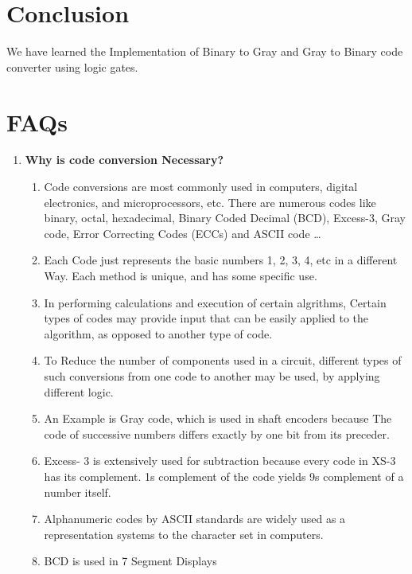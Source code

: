 \documentclass[11pt]{article}
\begin{document}
\section{Conclusion}
We have learned the Implementation of Binary to Gray and Gray to Binary code converter using logic gates.


\section{FAQs}

\begin{enumerate}
	\item \textbf{Why is code conversion Necessary?}
	\begin{enumerate}
		\item Code conversions are most commonly used in computers, digital electronics, and microprocessors, etc. There are numerous codes like binary, octal, hexadecimal, Binary Coded Decimal (BCD), Excess-3, Gray code, Error Correcting Codes (ECCs) and ASCII code \dots
		\item Each Code just represents the basic numbers 1, 2, 3, 4, etc in a different Way. Each method is unique, and has some specific use. 
		\item In performing calculations and execution of certain algrithms, Certain types of codes may provide input that can be easily applied to the algorithm, as opposed to another type of code. 
		\item To Reduce the number of components used in a circuit, different types of such conversions from one code to another may be used, by applying different logic.
		\item An Example is Gray code, which is used in shaft encoders because The code of successive numbers differs exactly by one bit from its preceder.
		\item Excess- 3 is extensively used for subtraction because every code in XS-3 has its complement. 1s complement of the code yields 9s complement of a number itself.
		\item Alphanumeric codes by ASCII standards are widely used as a representation systems to the character set in computers.
		\item BCD is used in 7 Segment Displays
	\end{enumerate}
	

\end{enumerate}
\end{document}
